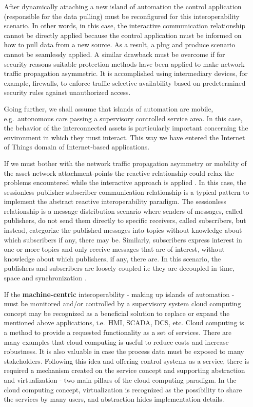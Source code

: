 \documentclass[runningheads]{llncs}
\begin{document}
After dynamically attaching a new island of automation the control application (responsible for the data pulling) must be reconfigured for this interoperability scenario. In other words, in this case, the interactive communication relationship cannot be directly applied because the control application must be informed on how to pull data from a new source. As a result, a plug and produce scenario \cite{PlugProduceByModellingSkills} cannot be seamlessly applied. A similar drawback must be overcome if for security reasons suitable protection methods have been applied to make network traffic propagation asymmetric. It is accomplished using intermediary devices, for example, firewalls, to enforce traffic selective availability based on predetermined security rules against unauthorized access.

Going further, we shall assume that islands of automation are mobile, e.g.~autonomous cars passing a supervisory controlled service area. In this case, the behavior of the interconnected assets is particularly important concerning the environment in which they must interact. This way we have entered the Internet of Things domain of Internet-based applications.

If we must bother with the network traffic propagation asymmetry or mobility of the asset network attachment-points the reactive relationship could relax the problems encountered while the interactive approach is applied \cite{mpostol2020}. In this case, the sessionless publisher-subscriber communication relationship is a typical pattern to implement the abstract reactive interoperability paradigm. The sessionless relationship is a message distribution scenario where senders of messages, called publishers, do not send them directly to specific receivers, called subscribers, but instead, categorize the published messages into topics without knowledge about which subscribers if any, there may be. Similarly, subscribers express interest in one or more topics and only receive messages that are of interest, without knowledge about which publishers, if any, there are. In this scenario, the publishers and subscribers are loosely coupled i.e they are decoupled in time, space and synchronization \cite{RefWorks:doc:5c44e246e4b0591b15ea9e59}.

If the \textbf{machine-centric} interoperability - making up islands of automation - must be monitored and/or controlled by a supervisory system cloud computing concept may be recognized as a beneficial solution to replace or expand the mentioned above applications, i.e.~HMI, SCADA, DCS, etc. Cloud computing is a method to provide a requested functionality as a set of services. There are many examples that cloud computing is useful to reduce costs and increase robustness. It is also valuable in case the process data must be exposed to many stakeholders. Following this idea and offering control systems as a service, there is required a mechanism created on the service concept and supporting abstraction and virtualization - two main pillars of the cloud computing paradigm. In the cloud computing concept, virtualization is recognized as the possibility to share the services by many users, and abstraction hides implementation details.
\end{document}
